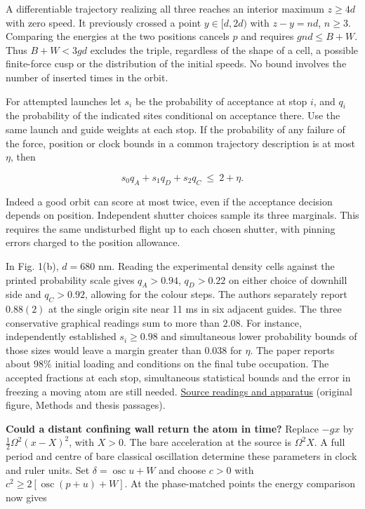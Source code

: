 \documentclass[11pt,a4paper]{article}
\begin{document}
A differentiable trajectory realizing all three reaches an interior
maximum \(z\ge4d\) with zero speed. It previously crossed a point
\(y\in[d,2d)\) with \(z-y=nd\), \(n\ge3\). Comparing the energies at the
two positions cancels \(p\) and requires \(gnd\le B+W\). Thus
\(B+W<3gd\) excludes the triple, regardless of the shape of a cell, a
possible finite-force cusp or the distribution of the initial speeds. No
bound involves the number of inserted times in the orbit.

For attempted launches let \(s_i\) be the probability of acceptance at
stop \(i\), and \(q_i\) the probability of the indicated sites
conditional on acceptance there. Use the same launch and guide weights
at each stop. If the probability of any failure of the force, position
or clock bounds in a common trajectory description is at most \(\eta\),
then

\[
             s_0q_A+s_1q_D+s_2q_C\ \le\ 2+\eta .
\]

Indeed a good orbit can score at most twice, even if the acceptance
decision depends on position. Independent shutter choices sample its
three marginals. This requires the same undisturbed flight up to each
chosen shutter, with pinning errors charged to the position allowance.

In Fig. 1(b), \(d=680\) nm. Reading the experimental density cells
against the printed probability scale gives \(q_A>0.94\), \(q_D>0.22\)
on either choice of downhill side and \(q_C>0.92\), allowing for the
colour steps. The authors separately report \(0.88(2)\) at the single
origin site near 11 ms in six adjacent guides. The three conservative
graphical readings sum to more than \(2.08\). For instance,
independently established \(s_i\ge0.98\) and simultaneous lower
probability bounds of those sizes would leave a margin greater than
\(0.038\) for \(\eta\). The paper reports about 98\% initial loading and
conditions on the final tube occupation. The accepted fractions at each
stop, simultaneous statistical bounds and the error in freezing a moving
atom are still needed.
\href{../docs/PreissEtAl_SingleAtomReturns_2015.md}{Source readings and
apparatus} (original figure, Methods and thesis passages).

\textbf{Could a distant confining wall return the atom in time?} Replace
\(-gx\) by \(\tfrac12\Omega^2(x-X)^2\), with \(X>0\). The bare
acceleration at the source is \(\Omega^2 X\). A full period and centre
of bare classical oscillation determine these parameters in clock and
ruler units. Set \(\delta=\operatorname{osc}u+W\) and choose \(c>0\)
with \(c^2\ge2[\operatorname{osc}(p+u)+W]\). At the phase-matched points
the energy comparison now gives
\end{document}

